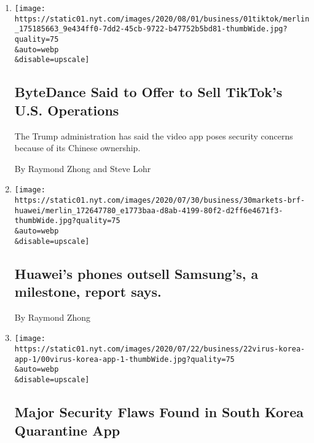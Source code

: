 \begin{enumerate}
\def\labelenumi{\arabic{enumi}.}
\item
  \href{/2020/08/01/technology/tiktok-sale-trump-ban.html}{}

  \texttt{[image: https://static01.nyt.com/images/2020/08/01/business/01tiktok/merlin\_175185663\_9e434ff0-7dd2-45cb-9722-b47752b5bd81-thumbWide.jpg?quality=75\\\&auto=webp\\\&disable=upscale]}

  \hypertarget{bytedance-said-to-offer-to-sell-tiktoks-us-operations}{%
  \subsection{ByteDance Said to Offer to Sell TikTok's U.S.
  Operations}\label{bytedance-said-to-offer-to-sell-tiktoks-us-operations}}

  The Trump administration has said the video app poses security
  concerns because of its Chinese ownership.

  By Raymond Zhong and Steve Lohr
\item
  \href{/2020/07/30/business/huaweis-phones-outsell-samsungs-a-milestone-report-says.html}{}

  \texttt{[image: https://static01.nyt.com/images/2020/07/30/business/30markets-brf-huawei/merlin\_172647780\_e1773baa-d8ab-4199-80f2-d2ff6e4671f3-thumbWide.jpg?quality=75\\\&auto=webp\\\&disable=upscale]}

  \hypertarget{huaweis-phones-outsell-samsungs-a-milestone-report-says}{%
  \subsection{Huawei's phones outsell Samsung's, a milestone, report
  says.}\label{huaweis-phones-outsell-samsungs-a-milestone-report-says}}

  By Raymond Zhong
\item
  \href{/2020/07/21/technology/korea-coronavirus-app-security.html}{}

  \texttt{[image: https://static01.nyt.com/images/2020/07/22/business/22virus-korea-app-1/00virus-korea-app-1-thumbWide.jpg?quality=75\\\&auto=webp\\\&disable=upscale]}

  \hypertarget{major-security-flaws-found-in-south-korea-quarantine-app}{%
  \subsection{Major Security Flaws Found in South Korea Quarantine
  App}\label{major-security-flaws-found-in-south-korea-quarantine-app}}


\end{enumerate}
